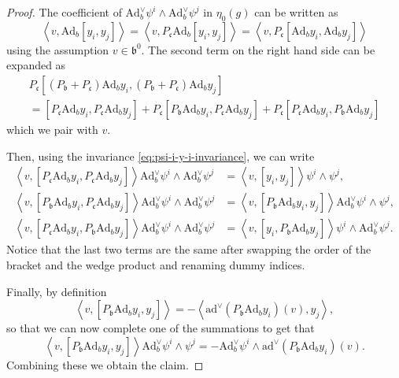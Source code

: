 \documentclass[a4paper,11pt]{amsart}
\newcommand{\fr}[1]{\mathfrak{#1}}
\newcommand{\Ad}{\mathrm{Ad}}
\newcommand{\ad}{\mathrm{ad}}
\theoremstyle{definition}
\theoremstyle{remark}
\begin{document}
\begin{proof}
The coefficient of $\Ad^\vee_b \psi^i \wedge \Ad^\vee_b \psi^j$ in $\eta_0(g)$ can be written as
\[
\left\langle v , \Ad_b \left[ y_i , y_j \right] \right\rangle = \left\langle v , P_{\fr{c}} \Ad_b \left[ y_i , y_j \right] \right\rangle = \left\langle v , P_{\fr{c}} \left[ \Ad_b y_i , \Ad_b y_j \right] \right\rangle
\]
using the assumption $v\in\fr{b}^0$.
The second term on the right hand side can be expanded as
\begin{multline*}
P_{\fr{c}} \left[ \left( P_{\fr{b}} + P_{\fr{c}} \right) \Ad_b y_i , \left( P_{\fr{b}} + P_{\fr{c}} \right) \Ad_b y_j \right] \\
= \left[ P_{\fr{c}} \Ad_b y_i , P_{\fr{c}} \Ad_b y_j \right] + P_{\fr{c}} \left[ P_{\fr{b}} \Ad_b y_i , P_{\fr{c}} \Ad_b y_j \right] + P_{\fr{c}} \mathopen{} \left[ P_{\fr{c}} \Ad_b y_i , P_{\fr{b}} \Ad_b y_j \right]
\end{multline*}
which we pair with $v$.

Then, using the invariance \eqref{eq:psi-i-y-i-invariance}, we can write
\begin{align*}
\left\langle v , \left[ P_{\fr{c}} \Ad_b y_i , P_{\fr{c}} \Ad_b y_j \right] \right\rangle \Ad^\vee_b \psi^i \wedge \Ad^\vee_b \psi^j &= \left\langle v , \left[ y_i , y_j \right] \right\rangle \psi^i \wedge \psi^j , \\
\left\langle v , \left[ P_{\fr{b}} \Ad_b y_i , P_{\fr{c}} \Ad_b y_j \right] \right\rangle \Ad^\vee_b \psi^i \wedge \Ad^\vee_b \psi^j &= \left\langle v , \left[ P_{\fr{b}} \Ad_b y_i , y_j \right] \right\rangle \Ad^\vee_b \psi^i \wedge \psi^j , \\
\left\langle v , \left[ P_{\fr{c}} \Ad_b y_i , P_{\fr{b}} \Ad_b y_j \right] \right\rangle \Ad^\vee_b \psi^i \wedge \Ad^\vee_b \psi^j &= \left\langle v , \left[ y_i , P_{\fr{b}} \Ad_b y_j \right] \right\rangle \psi^i \wedge \Ad^\vee_b \psi^j .
\end{align*}
Notice that the last two terms are the same after swapping the order of the bracket and the wedge product and renaming dummy indices.

Finally, by definition
\[
\left\langle v , \left[ P_{\fr{b}} \Ad_b y_i , y_j \right] \right\rangle = - \left\langle \ad^\vee (P_{\fr{b}} \Ad_b y_i) (v) , y_j \right\rangle ,
\]
so that we can now complete one of the summations to get that
\[
\left\langle v , \left[ P_{\fr{b}} \Ad_b y_i , y_j \right] \right\rangle \Ad^\vee_b \psi^i \wedge \psi^j = - \Ad^\vee_b \psi^i \wedge \ad^\vee ( P_{\fr{b}} \Ad_b y_i ) (v) .
\]
Combining these we obtain the claim.
\end{proof}
\end{document}
